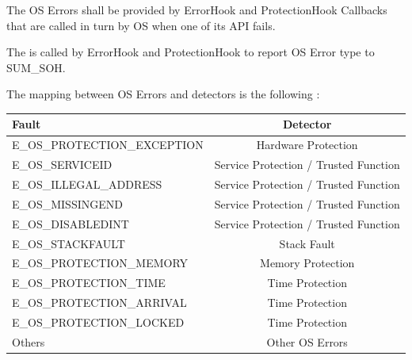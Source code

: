 {
    The OS Errors shall be provided by ErrorHook and ProtectionHook Callbacks that are called in turn  by OS when one of its API fails.\newline

    The \textbf{} is called by ErrorHook and ProtectionHook to report OS Error type to SUM\_SOH.\newline

    The mapping between OS Errors and detectors is the following :\newline

    \begin{center}\begin{tabular}{|l|c|}
    \hline
    \textbf{Fault}                & \textbf{Detector}               \\ \hline
    E_OS_PROTECTION_EXCEPTION   &  Hardware Protection       \\ \hline
    E_OS_SERVICEID     &  Service Protection / Trusted Function       \\ \hline
    E_OS_ILLEGAL_ADDRESS     &  Service Protection / Trusted Function       \\ \hline
    E_OS_MISSINGEND     &  Service Protection / Trusted Function       \\ \hline
    E_OS_DISABLEDINT     &  Service Protection / Trusted Function       \\ \hline
    E_OS_STACKFAULT           &  Stack Fault       \\ \hline
    E_OS_PROTECTION_MEMORY       &  Memory Protection                 \\ \hline
    E_OS_PROTECTION_TIME      &  Time Protection                 \\ \hline
    E_OS_PROTECTION_ARRIVAL        &  Time Protection                 \\ \hline
    E_OS_PROTECTION_LOCKED        &  Time Protection                 \\ \hline
    Others                     &  Other OS Errors                 \\ \hline
    \hline
    \end{tabular}\end{center}  
}
{
      
}


